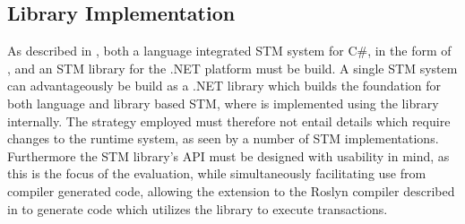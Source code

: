 \subsection{Library Implementation}
As described in , both a language integrated \ac{STM} system for C\#, in the form of \stmname, and an \ac{STM} library for the .NET platform must be build. A single \ac{STM} system can advantageously be build as a .NET library which builds the foundation for both language and library based \ac{STM}, where \stmname is implemented using the library internally.
The strategy employed must therefore not entail details which require changes to the runtime system, as seen by a number of \ac{STM} implementations\cite{mohamedin2013bytestm}\cite{harris2003language}. Furthermore the \ac{STM} library's \ac{API} must be designed with usability in mind, as this is the focus of the evaluation, while simultaneously facilitating use from compiler generated code, allowing the extension to the Roslyn compiler described in  to generate code which utilizes the library to execute transactions.

